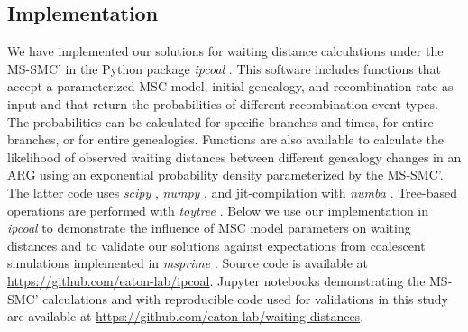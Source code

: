 \documentclass[11pt]{article}
\begin{document}
\subsection{Implementation}
We have implemented our solutions for waiting distance calculations
under the MS-SMC' in the Python package \emph{ipcoal} \citep{mckenzie_ipcoal_2020}.
This software includes functions that accept a parameterized MSC model, initial genealogy, 
and recombination rate as input and that return the probabilities of different 
recombination event types. The probabilities can be calculated for specific 
branches and times, for entire branches, or for entire genealogies. 
Functions are also available to calculate the likelihood of observed 
waiting distances between different genealogy changes in an ARG 
using an exponential probability density parameterized by the MS-SMC'.
The latter code uses \emph{scipy} \citep{2020SciPy-NMeth}, 
\emph{numpy} \citep{harris2020array}, and jit-compilation with \emph{numba} 
\citep{lam2015numba}. Tree-based operations are performed with \emph{toytree} 
\citep{eaton_toytree_2020}.
Below we use our implementation in \emph{ipcoal} to demonstrate the influence of 
MSC model parameters on waiting distances and to validate our solutions against 
expectations from coalescent simulations implemented in 
\emph{msprime} \citep{baumdicker_efficient_2022}.
Source code is available at \url{https://github.com/eaton-lab/ipcoal}.
Jupyter notebooks demonstrating the MS-SMC' calculations and with 
reproducible code used for validations in this study are available
at \url{https://github.com/eaton-lab/waiting-distances}.

\end{document}
